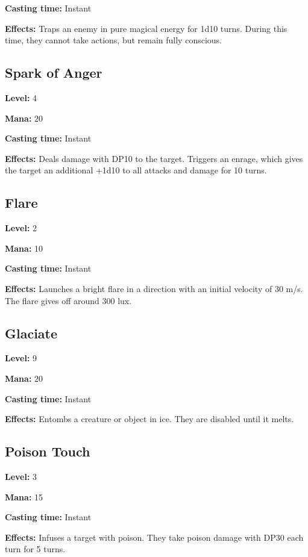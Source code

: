 \documentclass[]{article}
\begin{document}
\textbf{Casting time:} Instant

\textbf{Effects:} Traps an enemy in pure magical energy for 1d10 turns.
During this time, they cannot take actions, but remain fully conscious.

\subsection{Spark of Anger}\label{spark-of-anger}

\textbf{Level:} 4

\textbf{Mana:} 20

\textbf{Casting time:} Instant

\textbf{Effects:} Deals damage with DP10 to the target. Triggers an
enrage, which gives the target an additional +1d10 to all attacks and
damage for 10 turns.

\subsection{Flare}\label{flare}

\textbf{Level:} 2

\textbf{Mana:} 10

\textbf{Casting time:} Instant

\textbf{Effects:} Launches a bright flare in a direction with an initial
velocity of 30 m/s. The flare gives off around 300 lux.

\subsection{Glaciate}\label{glaciate}

\textbf{Level:} 9

\textbf{Mana:} 20

\textbf{Casting time:} Instant

\textbf{Effects:} Entombs a creature or object in ice. They are disabled
until it melts.

\subsection{Poison Touch}\label{poison-touch}

\textbf{Level:} 3

\textbf{Mana:} 15

\textbf{Casting time:} Instant

\textbf{Effects:} Infuses a target with poison. They take poison damage
with DP30 each turn for 5 turns.
\end{document}
